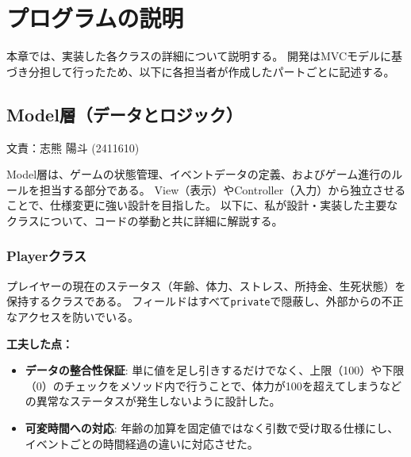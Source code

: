 \documentclass[a4paper,11pt]{jsarticle}
\begin{document}
\newpage

\section{プログラムの説明}

本章では、実装した各クラスの詳細について説明する。
開発はMVCモデルに基づき分担して行ったため、以下に各担当者が作成したパートごとに記述する。

\subsection{Model層（データとロジック）}
\begin{flushright}
文責：志熊 陽斗 (2411610)
\end{flushright}

Model層は、ゲームの状態管理、イベントデータの定義、およびゲーム進行のルールを担当する部分である。
View（表示）やController（入力）から独立させることで、仕様変更に強い設計を目指した。
以下に、私が設計・実装した主要なクラスについて、コードの挙動と共に詳細に解説する。

\subsubsection{Playerクラス}
プレイヤーの現在のステータス（年齢、体力、ストレス、所持金、生死状態）を保持するクラスである。
フィールドはすべて\texttt{private}で隠蔽し、外部からの不正なアクセスを防いでいる。

\textbf{工夫した点：}
\begin{itemize}
    \item \textbf{データの整合性保証}: 単に値を足し引きするだけでなく、上限（100）や下限（0）のチェックをメソッド内で行うことで、体力が100を超えてしまうなどの異常なステータスが発生しないように設計した。
    \item \textbf{可変時間への対応}: 年齢の加算を固定値ではなく引数で受け取る仕様にし、イベントごとの時間経過の違いに対応させた。
\end{itemize}
\end{document}
